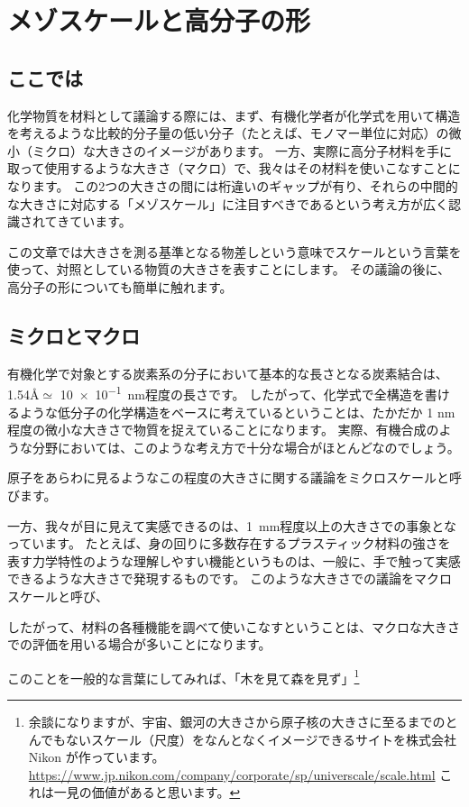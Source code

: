 \documentclass[a4paper,11pt]{jlreq}
\begin{document}
\section{メゾスケールと高分子の形}
\subsection{ここでは}
化学物質を材料として議論する際には、まず、有機化学者が化学式を用いて構造を考えるような比較的分子量の低い分子（たとえば、モノマー単位に対応）の微小（ミクロ）な大きさのイメージがあります。
一方、実際に高分子材料を手に取って使用するような大きさ（マクロ）で、我々はその材料を使いこなすことになります。
この2つの大きさの間には桁違いのギャップが有り、それらの中間的な大きさに対応する「メゾスケール」に注目すべきであるという考え方が広く認識されてきています。

この文章では大きさを測る基準となる物差しという意味でスケールという言葉を使って、対照としている物質の大きさを表すことにします。
その議論の後に、高分子の形についても簡単に触れます。

\subsection{ミクロとマクロ}

有機化学で対象とする炭素系の分子において基本的な長さとなる炭素結合は、1.54\AA $\simeq$ \qty{10e-1}{\nano\meter}程度の長さです。
したがって、化学式で全構造を書けるような低分子の化学構造をベースに考えているということは、たかだか 1 nm 程度の微小な大きさで物質を捉えていることになります。
実際、有機合成のような分野においては、このような考え方で十分な場合がほとんどなのでしょう。

原子をあらわに見るようなこの程度の大きさに関する議論をミクロスケールと呼びます。

一方、我々が目に見えて実感できるのは、\qty{1}{\mm}程度以上の大きさでの事象となっています。
たとえば、身の回りに多数存在するプラスティック材料の強さを表す力学特性のような理解しやすい機能というものは、一般に、手で触って実感できるような大きさで発現するものです。
このような大きさでの議論をマクロスケールと呼び、

したがって、材料の各種機能を調べて使いこなすということは、マクロな大きさでの評価を用いる場合が多いことになります。

このことを一般的な言葉にしてみれば、「木を見て森を見ず」\footnote{余談になりますが、宇宙、銀河の大きさから原子核の大きさに至るまでのとんでもないスケール（尺度）をなんとなくイメージできるサイトを株式会社 Nikon が作っています。
	\url{https://www.jp.nikon.com/company/corporate/sp/universcale/scale.html}
	これは一見の価値があると思います。
}
\end{document}
